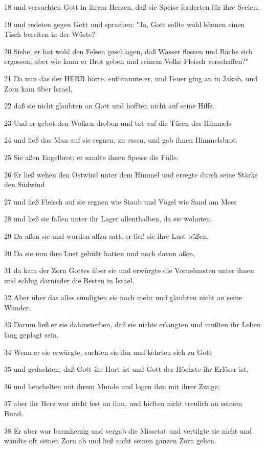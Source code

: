 \par 18 und versuchten Gott in ihrem Herzen, daß sie Speise forderten für ihre Seelen,
\par 19 und redeten gegen Gott und sprachen: "Ja, Gott sollte wohl können einen Tisch bereiten in der Wüste?
\par 20 Siehe, er hat wohl den Felsen geschlagen, daß Wasser flossen und Bäche sich ergossen; aber wie kann er Brot geben und seinem Volke Fleisch verschaffen?"
\par 21 Da nun das der HERR hörte, entbrannte er, und Feuer ging an in Jakob, und Zorn kam über Israel,
\par 22 daß sie nicht glaubten an Gott und hofften nicht auf seine Hilfe.
\par 23 Und er gebot den Wolken droben und tat auf die Türen des Himmels
\par 24 und ließ das Man auf sie regnen, zu essen, und gab ihnen Himmelsbrot.
\par 25 Sie aßen Engelbrot; er sandte ihnen Speise die Fülle.
\par 26 Er ließ wehen den Ostwind unter dem Himmel und erregte durch seine Stärke den Südwind
\par 27 und ließ Fleisch auf sie regnen wie Staub und Vögel wie Sand am Meer
\par 28 und ließ sie fallen unter ihr Lager allenthalben, da sie wohnten.
\par 29 Da aßen sie und wurden allzu satt; er ließ sie ihre Lust büßen.
\par 30 Da sie nun ihre Lust gebüßt hatten und noch davon aßen,
\par 31 da kam der Zorn Gottes über sie und erwürgte die Vornehmsten unter ihnen und schlug darnieder die Besten in Israel.
\par 32 Aber über das alles sündigten sie noch mehr und glaubten nicht an seine Wunder.
\par 33 Darum ließ er sie dahinsterben, daß sie nichts erlangten und mußten ihr Leben lang geplagt sein.
\par 34 Wenn er sie erwürgte, suchten sie ihn und kehrten sich zu Gott
\par 35 und gedachten, daß Gott ihr Hort ist und Gott der Höchste ihr Erlöser ist,
\par 36 und heuchelten mit ihrem Munde und logen ihm mit ihrer Zunge;
\par 37 aber ihr Herz war nicht fest an ihm, und hielten nicht treulich an seinem Bund.
\par 38 Er aber war barmherzig und vergab die Missetat und vertilgte sie nicht und wandte oft seinen Zorn ab und ließ nicht seinen ganzen Zorn gehen.
